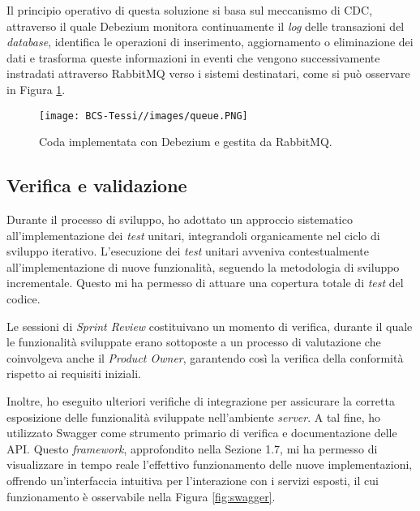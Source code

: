         \vspace{0.2 em}
        \noindent Il principio operativo di questa soluzione si basa sul meccanismo di CDC, attraverso il quale Debezium monitora continuamente il \textit{log} delle transazioni del \textit{database}, identifica le operazioni di inserimento, aggiornamento o eliminazione dei dati e trasforma queste informazioni in eventi che vengono successivamente instradati attraverso RabbitMQ verso i sistemi destinatari, come si può osservare in Figura \ref{fig:queue}.

        \begin{figure}[H]
            \centering
            \texttt{[image: BCS-Tessi//images/queue.PNG]}
            \caption{Coda implementata con Debezium e gestita da RabbitMQ.}
            \label{fig:queue}
        \end{figure}

        
        \subsection{Verifica e validazione}
        Durante il processo di sviluppo, ho adottato un approccio sistematico all'implementazione dei \textit{test} unitari, integrandoli organicamente nel ciclo di sviluppo iterativo. L'esecuzione dei \textit{test} unitari avveniva contestualmente all'implementazione di nuove funzionalità, seguendo la metodologia di sviluppo incrementale. Questo mi ha permesso di attuare una copertura totale di \textit{test} del codice.

        \vspace{0.2 em}
        \noindent Le sessioni di \textit{Sprint Review} costituivano un momento di verifica, durante il quale le funzionalità sviluppate erano sottoposte a un processo di valutazione che coinvolgeva anche il \textit{Product Owner}, garantendo così la verifica della conformità rispetto ai requisiti iniziali.

        \vspace{0.2 em}
        \noindent Inoltre, ho eseguito ulteriori verifiche di integrazione per assicurare la corretta esposizione delle funzionalità sviluppate nell'ambiente \textit{server}. A tal fine, ho utilizzato Swagger come strumento primario di verifica e documentazione delle API. Questo \textit{framework}, approfondito nella Sezione 1.7, mi ha permesso di visualizzare in tempo reale l'effettivo funzionamento delle nuove implementazioni, offrendo un'interfaccia intuitiva per l'interazione con i servizi esposti, il cui funzionamento è osservabile nella Figura \ref{fig:swagger}.
        
